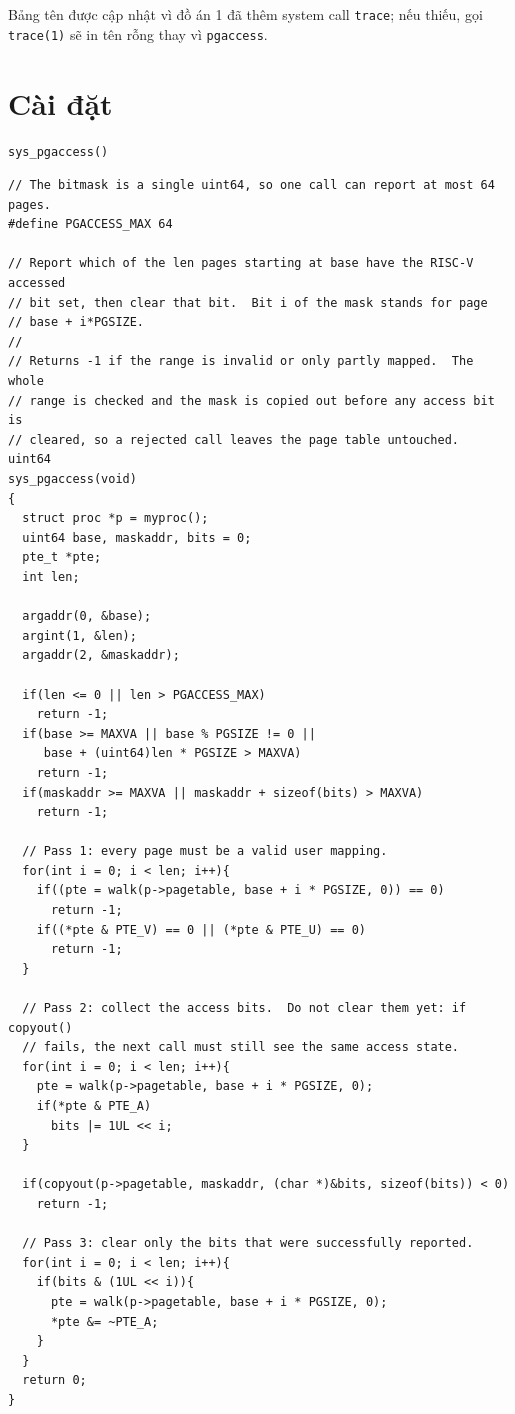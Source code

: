 Bảng tên được cập nhật vì đồ án 1 đã thêm system call \texttt{trace}; nếu thiếu, gọi \texttt{trace(1)} sẽ in tên rỗng thay vì \texttt{pgaccess}.

\section{Cài đặt}

\begin{codebox}[sysPgaccess]{\texttt{sys\_pgaccess()}}
    \begin{verbatim}
// The bitmask is a single uint64, so one call can report at most 64 pages.
#define PGACCESS_MAX 64

// Report which of the len pages starting at base have the RISC-V accessed
// bit set, then clear that bit.  Bit i of the mask stands for page
// base + i*PGSIZE.
//
// Returns -1 if the range is invalid or only partly mapped.  The whole
// range is checked and the mask is copied out before any access bit is
// cleared, so a rejected call leaves the page table untouched.
uint64
sys_pgaccess(void)
{
  struct proc *p = myproc();
  uint64 base, maskaddr, bits = 0;
  pte_t *pte;
  int len;

  argaddr(0, &base);
  argint(1, &len);
  argaddr(2, &maskaddr);

  if(len <= 0 || len > PGACCESS_MAX)
    return -1;
  if(base >= MAXVA || base % PGSIZE != 0 ||
     base + (uint64)len * PGSIZE > MAXVA)
    return -1;
  if(maskaddr >= MAXVA || maskaddr + sizeof(bits) > MAXVA)
    return -1;

  // Pass 1: every page must be a valid user mapping.
  for(int i = 0; i < len; i++){
    if((pte = walk(p->pagetable, base + i * PGSIZE, 0)) == 0)
      return -1;
    if((*pte & PTE_V) == 0 || (*pte & PTE_U) == 0)
      return -1;
  }

  // Pass 2: collect the access bits.  Do not clear them yet: if copyout()
  // fails, the next call must still see the same access state.
  for(int i = 0; i < len; i++){
    pte = walk(p->pagetable, base + i * PGSIZE, 0);
    if(*pte & PTE_A)
      bits |= 1UL << i;
  }

  if(copyout(p->pagetable, maskaddr, (char *)&bits, sizeof(bits)) < 0)
    return -1;

  // Pass 3: clear only the bits that were successfully reported.
  for(int i = 0; i < len; i++){
    if(bits & (1UL << i)){
      pte = walk(p->pagetable, base + i * PGSIZE, 0);
      *pte &= ~PTE_A;
    }
  }
  return 0;
}
    \end{verbatim}
\end{codebox}

